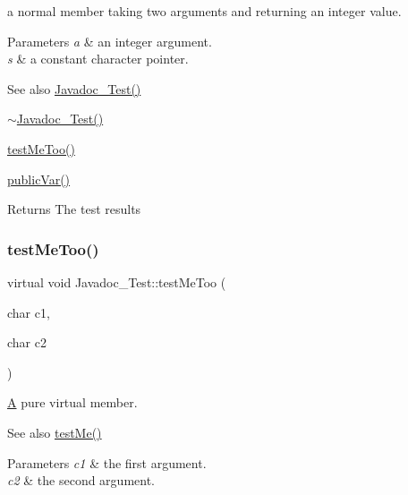 a normal member taking two arguments and returning an integer value. 
\begin{DoxyParams}{Parameters}
{\em a} & an integer argument. \\
\hline
{\em s} & a constant character pointer. \\
\hline
\end{DoxyParams}
\begin{DoxySeeAlso}{See also}
\mbox{\hyperlink{class_javadoc___test_a17313327932ae97596b0a455ba8342cc}{Javadoc\+\_\+\+Test()}} 

\mbox{\hyperlink{class_javadoc___test_a60016cd15a4ed82bbc35be79a0a6a6b5}{$\sim$\+Javadoc\+\_\+\+Test()}} 

\mbox{\hyperlink{class_javadoc___test_ac2b39cabbe80957ae3e8bc2bd4e887f6}{test\+Me\+Too()}} 

\mbox{\hyperlink{class_javadoc___test_a44a516fbc3a4865e2dcae34649c9df6a}{public\+Var()}} 
\end{DoxySeeAlso}
\begin{DoxyReturn}{Returns}
The test results 
\end{DoxyReturn}
\mbox{\label{class_javadoc___test_ac2b39cabbe80957ae3e8bc2bd4e887f6}} 
\subsubsection{\texorpdfstring{testMeToo()}{testMeToo()}}
{\footnotesize\ttfamily virtual void Javadoc\+\_\+\+Test\+::test\+Me\+Too (\begin{DoxyParamCaption}\item[{char}]{c1,  }\item[{char}]{c2 }\end{DoxyParamCaption})\hspace{0.3cm}{\ttfamily [pure virtual]}}

\mbox{\hyperlink{class_a}{A}} pure virtual member. \begin{DoxySeeAlso}{See also}
\mbox{\hyperlink{class_javadoc___test_a0c472683ed25ff096e8a9edfb18d550c}{test\+Me()}} 
\end{DoxySeeAlso}

\begin{DoxyParams}{Parameters}
{\em c1} & the first argument. \\
\hline
{\em c2} & the second argument. \\
\hline
\end{DoxyParams}


